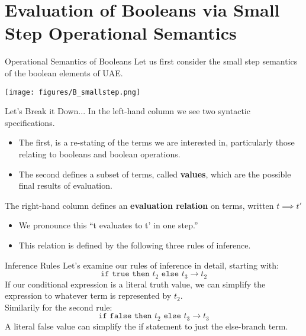 \documentclass[11pt]{beamer}
\begin{document}
\section[Bool Eval]{Evaluation of Booleans via Small Step Operational Semantics}

\begin{frame}[fragile=singleslide]{Operational Semantics of Booleans}
Let us first consider the small step semantics of the boolean elements of UAE.
\begin{center}
\texttt{[image: figures/B\_smallstep.png]}
\end{center}
\end{frame}

\begin{frame}[fragile=singleslide]{Let's Break it Down...}
In the left-hand column we see two syntactic specifications.  
\begin{itemize}
\item The first, is a re-stating of the terms we are interested in, particularly those relating to booleans and boolean operations.
\item The second defines a subset of terms, called \textbf{values}, which are the possible final results of evaluation.  
\end{itemize}
The right-hand column defines an \textbf{evaluation relation} on terms, written $t \implies t'$
\begin{itemize}
\item We pronounce this ``t evaluates to t' in one step.'' 
\item This relation is defined by the following three rules of inference.  
\end{itemize}
\end{frame}

\begin{frame}[fragile=singleslide]{Inference Rules}
Let's examine our rules of inference in detail, starting with:
\begin{equation}
\texttt{if true then } t_2 \texttt{ else } t_3 \rightarrow t_2
\end{equation}
If our conditional expression is a literal truth value, we can simplify the expression to whatever term is represented by $t_2$. \\
\vspace{1em}
Similarily for the second rule: 
\begin{equation}
\texttt{if false then } t_2 \texttt{ else } t_3 \rightarrow t_3
\end{equation}
A literal false value can simplify the if statement to just the else-branch term.  
\end{frame}
\end{document}
